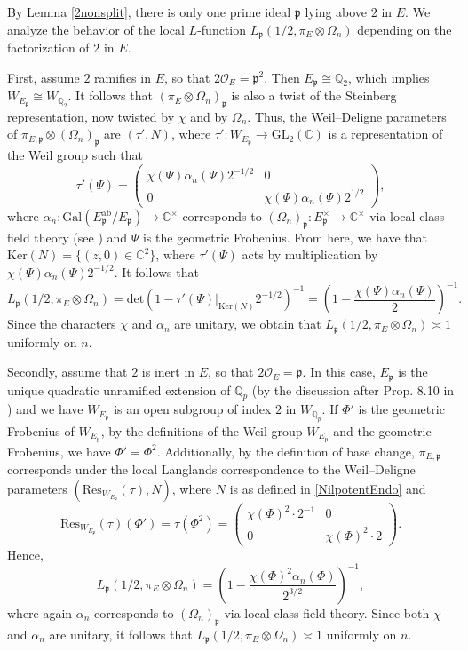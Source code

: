 \documentclass[11pt]{amsart}
\newcommand{\bigo}{\mathcal{O}}
\newcommand{\Q}{\mathbb{Q}}
\newcommand{\C}{\mathbb{C}}
\newcommand{\p}{\mathfrak{p}}
\newcommand{\GL}{\mathrm{GL}}
\theoremstyle{definition}
\theoremstyle{remark}
\begin{document}
By Lemma \ref{2nonsplit}, there is only one prime ideal $\p$ lying above $2$ in $E$. We analyze the behavior of the local $L$-function $L_{\p}(1/2, \pi_{E}\otimes \Omega_n)$ depending on the factorization of $2$ in $E$.

First, assume $2$ ramifies in $E$, so that $2\bigo_E = \p^2$. Then $E_{\p} \cong \Q_2$, which implies $W_{E_{\p}} \cong W_{\Q_2}$. It follows that $(\pi_{E}\otimes \Omega_n)_{\p}$ is also a twist of the Steinberg representation, now twisted by $\chi$ and by $\Omega_n$. Thus, the Weil--Deligne parameters of $\pi_{E,\p}\otimes (\Omega_n)_{\p}$ are $(\tau',N)$, where $\tau':W_{E_{\p}} \rightarrow \GL_2(\C)$ is a representation of the Weil group such that $$ \tau'(\Psi) = \begin{pmatrix}
    \chi(\Psi) \alpha_n(\Psi) 2^{-1/2} & 0 \\ 0 & \chi(\Psi) \alpha_n(\Psi) 2^{1/2}
\end{pmatrix},$$ where $\alpha_n:\mathrm{Gal}(E_{\p}^{\mathrm{ab}}/E_{\p}) \rightarrow \C^{\times}$ corresponds to $(\Omega_n)_{\p}:E_{\p}^{\times} \rightarrow \C^{\times}$ via local class field theory (see \cite[Ch. III, Thm. 3.1]{milneCFT}) and $\Psi$ is the geometric Frobenius. From here, we have that $\mathrm{Ker}(N) = \{(z,0) \in \C^2\}$, where $\tau'(\Psi)$ acts by multiplication by $\chi(\Psi) \alpha_n(\Psi) 2^{-1/2}$. It follows that $$ L_{\p}(1/2, \pi_{E}\otimes \Omega_n) = \mathrm{det}\left( 1-\tau'(\Psi)|_{\mathrm{Ker}(N)} 2^{-1/2} \right)^{-1} = \left( 1-\frac{\chi(\Psi) \alpha_n(\Psi)}{2} \right)^{-1}.$$ Since the characters $\chi$ and $\alpha_n$ are unitary, we obtain that $L_{\p}(1/2,\pi_E\otimes \Omega_n) \asymp 1$ uniformly on $n$.

Secondly, assume that $2$ is inert in $E$, so that $2\bigo_E = \p$. In this case, $E_{\p}$ is the unique quadratic unramified extension of $\Q_p$ (by the discussion after Prop. 8.10 in \cite{milneANT}) and we have $W_{E_{\p}}$ is an open subgroup of index $2$ in $W_{\Q_p}$. If $\Phi'$ is the geometric Frobenius of $W_{E_{\p}}$, by the definitions of the Weil group $W_{E_{\p}}$ and the geometric Frobenius, we have $\Phi' = \Phi^2$. Additionally, by the definition of base change, $\pi_{E,\p}$ corresponds under the local Langlands correspondence to the Weil--Deligne parameters $(\mathrm{Res}_{W_{E_{\p}}}(\tau),N)$, where $N$ is as defined in \eqref{NilpotentEndo} and $$ \mathrm{Res}_{W_{E_{\p}}}(\tau)(\Phi') = \tau(\Phi^2) = \begin{pmatrix}
    \chi(\Phi)^2 \cdot 2^{-1} & 0 \\ 0 & \chi(\Phi)^2 \cdot 2
\end{pmatrix}.$$ Hence, $$ L_{\p}(1/2, \pi_E\otimes \Omega_n) = \left( 1-\frac{\chi(\Phi)^2 \alpha_n(\Phi)}{2^{3/2}} \right)^{-1},$$ where again $\alpha_n$ corresponds to $(\Omega_n)_{\p}$ via local class field theory. Since both $\chi$ and $\alpha_n$ are unitary, it follows that $L_{\p}(1/2, \pi_E\otimes \Omega_n) \asymp 1$ uniformly on $n$.
\end{document}
